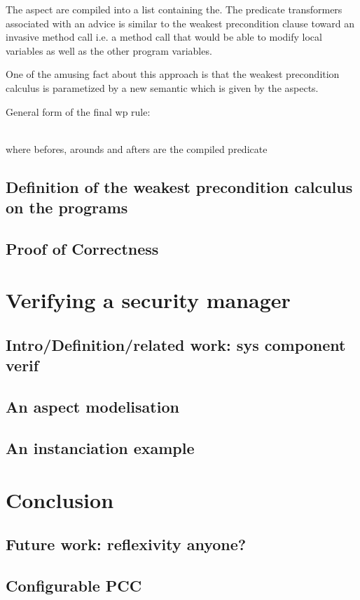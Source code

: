 \documentclass[draft]{llncs}
\begin{document}
The aspect are compiled into a list containing the.
The predicate transformers associated with an advice is similar to the weakest precondition
clause toward an invasive method call i.e. a method call that would be able to modify local variables
as well as the other program variables.

One of the amusing fact about this approach is that the weakest precondition calculus is parametized by a new 
semantic which is given by the aspects.

General form of the final wp rule:
\bcode

\\
\ecode
where befores, arounds and afters are the compiled predicate
\subsection{Definition of the weakest precondition calculus on the programs}
\subsection{Proof of Correctness}
%
\section{Verifying a security manager}
\subsection{Intro/Definition/related work: sys component verif}
\subsection{An aspect modelisation}
\subsection{An instanciation example}
\section{Conclusion}
\subsection{Future work: reflexivity anyone?}
\subsection{Configurable PCC}
%
%




%
\end{document}
